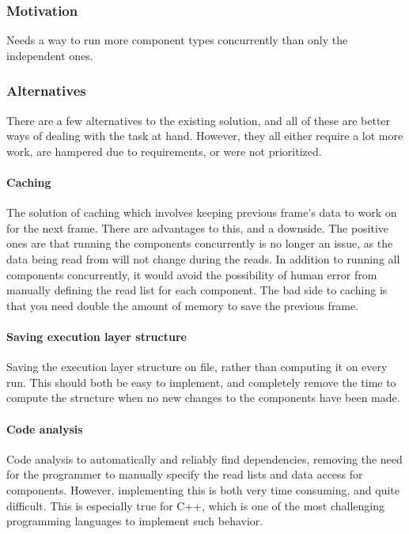 \subsubsection{Motivation}
Needs a way to run more component types concurrently than only the independent ones.

\subsubsection{Alternatives}
There are a few alternatives to the existing solution, and all of these are better ways of dealing with the task at hand.
However, they all either require a lot more work, are hampered due to requirements, or were not prioritized.

\paragraph{Caching}
The solution of caching which involves keeping previous frame's data to work on for the next frame.
There are advantages to this, and a downside.
The positive ones are that running the components concurrently is no longer an issue, as the data being read from will not change during the reads.
In addition to running all components concurrently, it would avoid the possibility of human error from manually defining the read list for each component.
The bad side to caching is that you need double the amount of memory to save the previous frame.

\paragraph{Saving execution layer structure}
Saving the execution layer structure on file, rather than computing it on every run.
This should both be easy to implement, and completely remove the time to compute the structure when no new changes to the components have been made.

\paragraph{Code analysis}
Code analysis to automatically and reliably find dependencies, removing the need for the programmer to manually specify the read lists and data access for components.
However, implementing this is both very time consuming, and quite difficult.
This is especially true for C++, which is one of the most challenging programming languages to implement such behavior.

